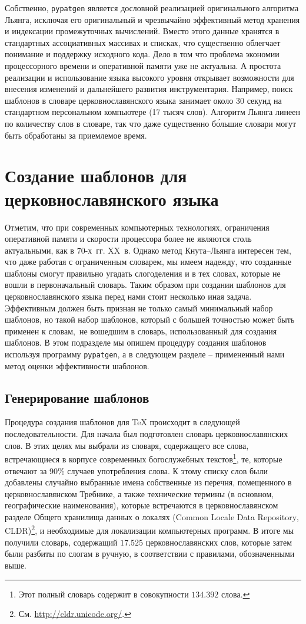\documentclass[12pt,a4paper,oneside]{extarticle}
\begin{document}
Собственно, \verb+pypatgen+ является дословной реализацией оригинального алгоритма Льянга, исключая его оригинальный и чрезвычайно
эффективный метод хранения и индексации промежуточных вычислений. Вместо этого данные хранятся в стандартных ассоциативных
массивах и списках, что существенно облегчает понимание и поддержку исходного кода.
Дело в том что проблема экономии процессорного времени и оперативной памяти уже не актуальна. 
А простота реализации и использование языка высокого уровня открывает возможности для внесения изменений и дальнейшего
развития инструментария. Например, поиск шаблонов в словаре церковнославянского языка занимает около 30 секунд на стандартном персональном
компьютере (17 тысяч слов). Алгоритм Льянга линеен по количеству слов в словаре, так что даже существенно б\'ольшие словари могут быть 
обработаны за приемлемое время.

\section{Создание шаблонов для церковнославянского языка}

Отметим, что при современных компьютерных технологиях, ограничения оперативной памяти и скорости процессора более не являются столь 
актуальными, как в 70-х~гг. XX~в. Однако метод Кнута--Льянга интересен тем, что даже работая с ограниченным словарем, мы имеем надежду, 
что созданные шаблоны смогут правильно угадать слогоделения и в тех словах, которые не вошли в первоначальный словарь. Таким образом при 
создании шаблонов для церковнославянского языка перед нами стоит несколько иная задача. Эффективным должен быть признан не только самый 
минимальный набор шаблонов, но такой набор шаблонов, который с большей точностью может быть применен к словам, не вошедшим в словарь, 
использованный для создания шаблонов. В этом подразделе мы опишем процедуру создания шаблонов используя программу \verb+pypatgen+, 
а в следующем разделе -- примененный нами метод оценки эффективности шаблонов.

\subsection{Генерирование шаблонов}

Процедура создания шаблонов для \TeX{} происходит в следующей последовательности. Для начала был подготовлен словарь церковнославянских слов. 
В этих целях мы выбрали из словаря, содержащего все слова, встречающиеся в корпусе современных богослужебных текстов\footnote{Этот полный 
словарь содержит в совокупности $134.392$ слова.}, те, которые отвечают за 90\% случаев употребления слова. К этому списку слов были 
добавлены случайно выбранные имена собственные из перечня, помещенного в церковнославянском Требнике, а также технические термины (в 
основном, географические наименования), которые встречаются в церковнославянском разделе Общего хранилища данных о 
локалях (\textenglish{Common Locale Data Repository}, CLDR)\footnote{См. \url{http://cldr.unicode.org/}.}, и необходимые для локализации 
компьютерных программ. В итоге мы получили словарь, содержащий $17.525$ церковнославянских слов, которые затем были разбиты по слогам в
ручную, в соответствии с правилами, обозначенными выше.
\end{document}
